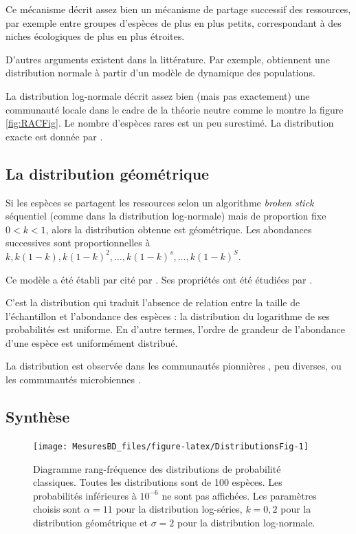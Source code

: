 \documentclass[
  11pt,
  french,
  a4paper,
  extrafontsizes,onecolumn,openright
  ]{memoir}
\begin{document}
Ce mécanisme décrit assez bien un mécanisme de partage successif des ressources, par exemple entre groupes d'espèces de plus en plus petits, correspondant à des niches écologiques de plus en plus étroites.

D'autres arguments existent dans la littérature.
Par exemple, \textcite{Engen1996} obtiennent une distribution normale à partir d'un modèle de dynamique des populations.

La distribution log-normale décrit assez bien (mais pas exactement) une communauté locale dans le cadre de la théorie neutre \autocite{Hubbell2001} comme le montre la figure \ref{fig:RACFig}.
Le nombre d'espèces rares est un peu surestimé.
La distribution exacte est donnée par \textcite{Volkov2003}.

\hypertarget{la-distribution-guxe9omuxe9trique}{%
\subsection{La distribution géométrique}\label{la-distribution-guxe9omuxe9trique}}

Si les espèces se partagent les ressources selon un algorithme \emph{broken stick} séquentiel (comme dans la distribution log-normale) mais de proportion fixe \(0<k<1\), alors la distribution obtenue est géométrique.
Les abondances successives sont proportionnelles à \(k, k(1-k), k(1-k)^2, \dots, k(1-k)^s, \dots, k(1-k)^S\).

Ce modèle a été établi par \textcite{Motomura1932} cité par \textcite{May1975}.
Ses propriétés ont été étudiées par \textcite{Whittaker1972}.

C'est la distribution qui traduit l'absence de relation entre la taille de l'échantillon et l'abondance des espèces \autocite{Pueyo2007}: la distribution du logarithme de ses probabilités est uniforme.
En d'autre termes, l'ordre de grandeur de l'abondance d'une espèce est uniformément distribué.

La distribution est observée dans les communautés pionnières \autocite{Bazzaz1975}, peu diverses, ou les communautés microbiennes \autocite{Haegeman2013}.

\hypertarget{synthuxe8se}{%
\subsection{Synthèse}\label{synthuxe8se}}



\scriptsize

\begin{figure}

{\centering \texttt{[image: MesuresBD\_files/figure-latex/DistributionsFig-1]} 

}

\caption{Diagramme rang-fréquence des distributions de probabilité classiques. Toutes les distributions sont de 100 espèces. Les probabilités inférieures à \(10^{-6}\) ne sont pas affichées. Les paramètres choisis sont \(\alpha=11\) pour la distribution log-séries, \(k=0,2\) pour la distribution géométrique et \(\sigma=2\) pour la distribution log-normale.}\label{fig:DistributionsFig}
\end{figure}
\end{document}
